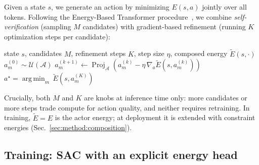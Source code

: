 \documentclass{article}
\begin{document}
Given a state $s$, we generate an action by minimizing $E(s, a)$ jointly over all tokens. Following the Energy-Based Transformer procedure~\citep{ebt_base2025, ebt_policy2025}, we combine \emph{self-verification} (sampling $M$ candidates) with gradient-based refinement (running $K$ optimization steps per candidate):
\begin{algorithm}[t]
\caption{Action generation with self-verification (single step)}
\label{alg:infer}
\begin{algorithmic}[1]
\Require state $s$, candidates $M$, refinement steps $K$, step size $\eta$, composed energy $\widetilde E(s, \cdot)$
    \State $a_m^{(0)} \sim \mathcal{U}(\mathcal{A})$ 
        \State $a_m^{(k+1)} \gets \operatorname{Proj}_{\mathcal{A}}\!\left(a_m^{(k)} - \eta\, \nabla_a \widetilde E(s, a_m^{(k)})\right)$
    \EndFor
\EndFor
\State \Return $a^\star = \operatorname*{arg\,min}_{m}\, \widetilde E\!\left(s, a_m^{(K)}\right)$
\end{algorithmic}
\end{algorithm}
Crucially, both $M$ and $K$ are knobs at inference time only: more candidates or more steps trade compute for action quality, and neither requires retraining. In training, $\widetilde E = E$ is the actor energy; at deployment it is extended with constraint energies (Sec.~\ref{sec:method:composition}).

\subsection{Training: SAC with an explicit energy head}
\label{sec:method:training}
\end{document}
